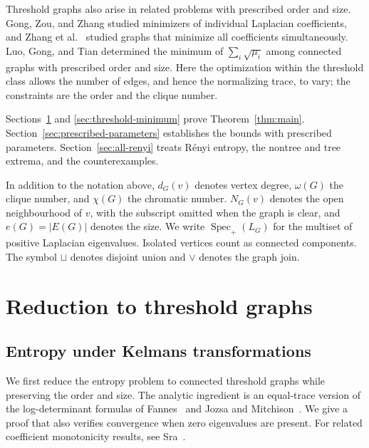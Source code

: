 \documentclass[11pt,a4paper,reqno]{amsart}
\theoremstyle{remark}
\newcommand{\Spec}{\operatorname{Spec}}
\numberwithin{equation}{section}
\begin{document}
Threshold graphs also arise in related problems with prescribed order
and size. Gong, Zou, and Zhang \cite{GongZouZhang2021} studied
minimizers of individual Laplacian coefficients, and Zhang et al.\
\cite{Zhang2025} studied graphs that minimize all coefficients
simultaneously. Luo, Gong, and Tian \cite{LuoGongTian2024} determined
the minimum of $\sum_i\sqrt{\mu_i}$ among connected graphs with
prescribed order and size. Here the optimization within the threshold
class allows the number of edges, and hence the normalizing trace,
to vary; the constraints are the order and the clique number.

Sections~\ref{sec:threshold-reduction} and
\ref{sec:threshold-minimum} prove Theorem~\ref{thm:main}.
Section~\ref{sec:prescribed-parameters} establishes the bounds with
prescribed parameters. Section~\ref{sec:all-renyi} treats R\'enyi
entropy, the nontree and tree extrema, and the counterexamples.

In addition to the notation above, $d_G(v)$ denotes vertex degree,
$\omega(G)$ the clique number, and $\chi(G)$ the chromatic number.
$N_G(v)$ denotes the open neighbourhood of $v$, with the subscript
omitted when the graph is clear, and $e(G)=|E(G)|$ denotes the size.
We write $\Spec_+(L_G)$ for the multiset of positive Laplacian eigenvalues.
Isolated vertices count as connected components. The symbol $\sqcup$
denotes disjoint union and $\vee$ denotes the graph join.


\section{Reduction to threshold graphs}\label{sec:threshold-reduction}
\subsection{Entropy under Kelmans transformations}\label{subsec:determinant-comparison}
We first reduce the entropy problem to connected threshold graphs while
preserving the order and size. The analytic ingredient is an equal-trace
version of the log-determinant formulas of Fannes~\cite{Fannes2014}
and Jozsa and Mitchison~\cite{JozsaMitchison2015}.
We give a proof that also verifies convergence when zero eigenvalues
are present. For related coefficient monotonicity results, see
Sra~\cite[Theorem 2.3]{Sra2019}.
\end{document}
